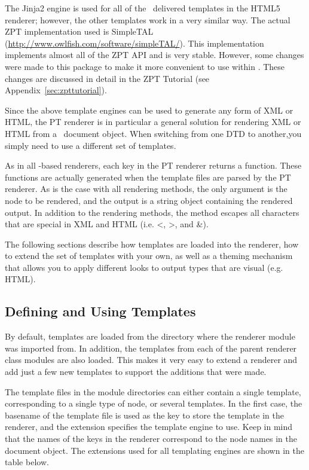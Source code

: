 The Jinja2 engine is used for all of the \plasTeX\ delivered templates
in the HTML5 renderer; however, the other templates work in a very similar way.
The actual ZPT implementation used is SimpleTAL
(\url{http://www.owlfish.com/software/simpleTAL/}).  This implementation
implements almost all of the ZPT API and is very stable.  However, some
changes were made to this package to make it more convenient to use
within \plasTeX.  These changes are discussed in detail in the
ZPT Tutorial (see Appendix~\ref{sec:zpttutorial}).

Since the above template engines can be used to generate any form of
XML or HTML, the PT renderer is in particular a general solution for rendering
XML or HTML from a \plasTeX\ document object.  When switching from one DTD to 
another,you simply need to use a different set of templates.

As in all -based renderers, each key in the PT renderer
returns a function.  These functions are actually generated when the
template files are parsed by the PT renderer.
As is the case with all rendering methods, the only argument is the node to be
rendered, and the output is a string object containing the rendered
output. In addition to the rendering methods, the  method
escapes all characters that are special in XML and HTML (i.e. <, >, and \&).

The following sections describe how templates are loaded into the
renderer, how to extend the set of templates with your own, as well
as a theming mechanism that allows you to apply different looks to
output types that are visual (e.g. HTML).

\subsection{Defining and Using Templates}

By default, templates are loaded from the directory where the
renderer module was imported from.  In addition, the templates from
each of the parent renderer class modules are also loaded.  This makes
it very easy to extend a renderer and add just a few new templates
to support the additions that were made.

The template files in the module directories can either contain a single 
template, corresponding to a single type of node, or several templates.
In the first case, the basename of the template file is used as the key to
store the template in the renderer, and the extension specifies the template 
engine to use. Keep in mind that the names of the keys in the renderer 
correspond to the node names in the document object. The extensions used for 
all templating engines are shown in the table below.

